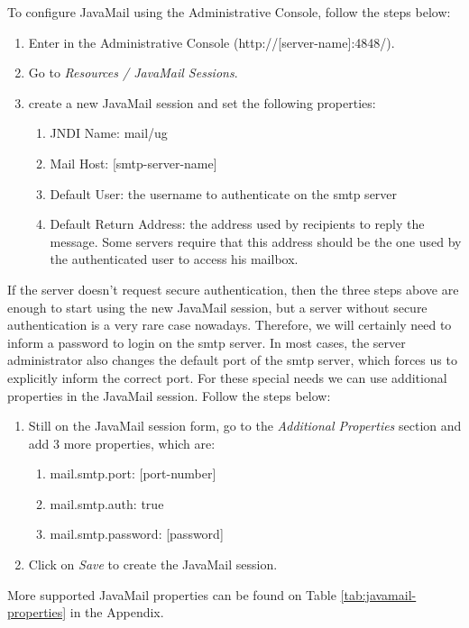 \documentclass[envcountsame,envcountchap]{svmono}
\begin{document}
To configure JavaMail using the Administrative Console, follow the steps below:

\begin{enumerate}
\item Enter in the Administrative Console (http://[server-name]:4848/).
\item Go to \textit{Resources / JavaMail Sessions}.
\item create a new JavaMail session and set the following properties:
   \begin{enumerate}
   \item JNDI Name: mail/ug
   \item Mail Host: [smtp-server-name]
   \item Default User: the username to authenticate on the smtp
    server
   \item Default Return Address: the address used by recipients to
    reply the message. Some servers require that this address
    should be the one used by the authenticated user to access his
    mailbox.
   \end{enumerate}
\end{enumerate}
 
If the server doesn't request secure authentication, then the three steps above are enough to start using the new JavaMail session, but a server without secure authentication is a very rare case nowadays. Therefore, we will certainly need to inform a password to login on the smtp server. In most cases, the server administrator also changes the default port of the smtp server, which forces us to explicitly inform the correct port. For these special needs we can use additional properties in the JavaMail session. Follow the steps below:

\begin{enumerate}
\item Still on the JavaMail session form, go to the \textit{Additional Properties} section and add 3 more properties, which are:
   \begin{enumerate}
   \item mail.smtp.port: [port-number]
   \item mail.smtp.auth: true
   \item mail.smtp.password: [password]
   \end{enumerate}
\item Click on \textit{Save} to create the JavaMail session.
\end{enumerate}

More supported JavaMail properties can be found on Table \ref{tab:javamail-properties} in the Appendix.
\end{document}
